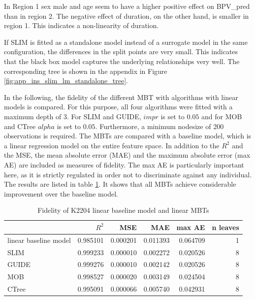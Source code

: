 In Region 1 sex male and age seem to have a higher positive effect on  BPV\_pred than in region 2. The negative effect of duration, on the other hand, is smaller in region 1. This indicates a non-linearity of duration.

If SLIM is fitted as a standalone model instead of a surrogate model in the same configuration, the differences in the split points are very small. This indicates that the black box model captures the underlying relationships very well. The corresponding tree is shown in the appendix in Figure \ref{fig:app_ins_slim_lm_standalone_tree}.

In the following, the fidelity of the different MBT with algorithms with linear models is compared. For this purpose, all four algorithms were fitted with a maximum depth of 3. For SLIM and GUIDE, $impr$ is set to $0.05$ and for MOB and CTree $alpha$ is set to $0.05$. Furthermore, a minimum nodesize of 200 observations is required.
The MBTs are compared with a baseline model, which is a linear regression model on the entire feature space. In addition to the $R^2$ and the MSE, the mean absolute error (MAE) and the maximum absolute error (max AE) are included as measures of fidelity. The max AE is particularly important here, as it is strictly regulated in order not to discriminate against any individual. 
The results are listed in table \ref{tab:ins_k2204_lm_surrogates_perf}. It shows that all MBTs achieve considerable improvement over the baseline model.

\begin{table}[!htb]

\caption{Fidelity of K2204 linear baseline model and linear MBTs}
\centering \scriptsize
\begin{tabular}[t]{l|r|r|r|r|r}
\hline
  & $R^2$ & MSE & MAE & max AE & n leaves\\
\hline
linear baseline model & 0.985101 & 0.000201 & 0.011393 & 0.064709 & 1\\
\hline
SLIM & 0.999233 & 0.000010 & 0.002272 & 0.020526 & 8\\
GUIDE & 0.999276 & 0.000010 & 0.002142 & 0.020526 & 8\\
MOB & 0.998527 & 0.000020 & 0.003149 & 0.024504 & 8\\
CTree & 0.995091 & 0.000066 & 0.005740 & 0.042931 & 8\\
\hline
\end{tabular}
\label{tab:ins_k2204_lm_surrogates_perf}
\end{table}

